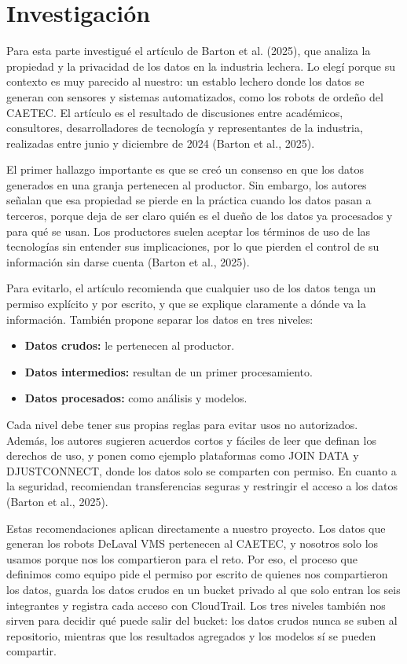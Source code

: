 \section{Investigación}

Para esta parte investigué el artículo de Barton et al. (2025), que analiza la propiedad y la privacidad de los datos en la industria lechera. Lo elegí porque su contexto es muy parecido al nuestro: un establo lechero donde los datos se generan con sensores y sistemas automatizados, como los robots de ordeño del CAETEC. El artículo es el resultado de discusiones entre académicos, consultores, desarrolladores de tecnología y representantes de la industria, realizadas entre junio y diciembre de 2024 (Barton et al., 2025).

El primer hallazgo importante es que se creó un consenso en que los datos generados en una granja pertenecen al productor. Sin embargo, los autores señalan que esa propiedad se pierde en la práctica cuando los datos pasan a terceros, porque deja de ser claro quién es el dueño de los datos ya procesados y para qué se usan. Los productores suelen aceptar los términos de uso de las tecnologías sin entender sus implicaciones, por lo que pierden el control de su información sin darse cuenta (Barton et al., 2025).

Para evitarlo, el artículo recomienda que cualquier uso de los datos tenga un permiso explícito y por escrito, y que se explique claramente a dónde va la información. También propone separar los datos en tres niveles:

\begin{itemize}
  \item \textbf{Datos crudos:} le pertenecen al productor.
  \item \textbf{Datos intermedios:} resultan de un primer procesamiento.
  \item \textbf{Datos procesados:} como análisis y modelos.
\end{itemize}

Cada nivel debe tener sus propias reglas para evitar usos no autorizados. Además, los autores sugieren acuerdos cortos y fáciles de leer que definan los derechos de uso, y ponen como ejemplo plataformas como JOIN DATA y DJUSTCONNECT, donde los datos solo se comparten con permiso. En cuanto a la seguridad, recomiendan transferencias seguras y restringir el acceso a los datos (Barton et al., 2025).

Estas recomendaciones aplican directamente a nuestro proyecto. Los datos que generan los robots DeLaval VMS pertenecen al CAETEC, y nosotros solo los usamos porque nos los compartieron para el reto. Por eso, el proceso que definimos como equipo pide el permiso por escrito de quienes nos compartieron los datos, guarda los datos crudos en un bucket privado al que solo entran los seis integrantes y registra cada acceso con CloudTrail. Los tres niveles también nos sirven para decidir qué puede salir del bucket: los datos crudos nunca se suben al repositorio, mientras que los resultados agregados y los modelos sí se pueden compartir.

